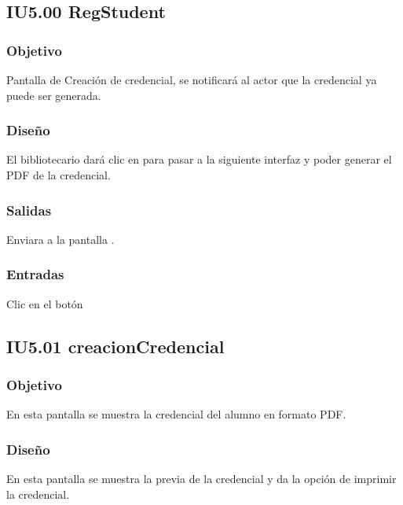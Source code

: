 \newpage
\subsection{IU5.00 RegStudent}

\subsubsection{Objetivo}
	Pantalla de Creación de credencial, se notificará al actor que la credencial ya puede ser generada.

\subsubsection{Diseño}
	El bibliotecario dará clic en  para pasar a la siguiente interfaz y poder generar el PDF de la credencial. 


\subsubsection{Salidas}
	\begin{Citemize}
		\item Enviara a la pantalla . 
	\end{Citemize}
	
\subsubsection{Entradas}
	\begin{Citemize}
		\item Clic en el botón  \IUbutton{Continuar}
	\end{Citemize}

\subsection{IU5.01 creacionCredencial}

\subsubsection{Objetivo}
	En esta pantalla se muestra la credencial del alumno en formato PDF.
\subsubsection{Diseño}
	En esta pantalla se muestra la previa de la credencial y da la opción de imprimir la credencial.

